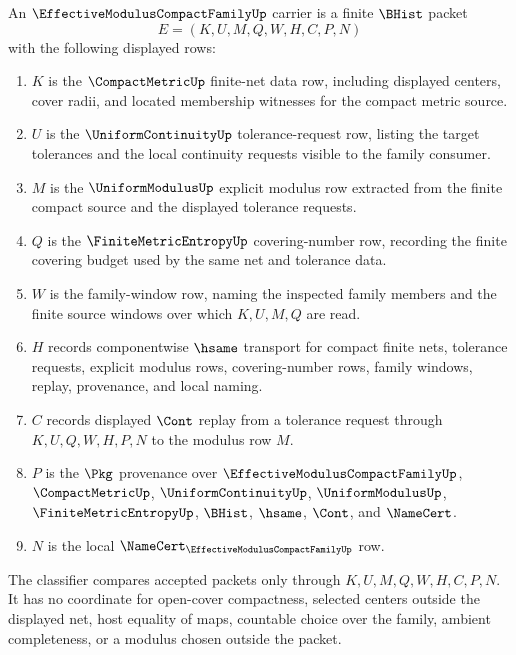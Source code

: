 \begin{definition}
\label{def:effective-modulus-compact-family-carrier}
An $\EffectiveModulusCompactFamilyUp$ carrier is a finite $\BHist$ packet
$$
E=(K,U,M,Q,W,H,C,P,N)
$$
with the following displayed rows:
\begin{enumerate}
\item $K$ is the $\CompactMetricUp$ finite-net data row, including displayed centers, cover radii, and located membership witnesses for the compact metric source.
\item $U$ is the $\UniformContinuityUp$ tolerance-request row, listing the target tolerances and the local continuity requests visible to the family consumer.
\item $M$ is the $\UniformModulusUp$ explicit modulus row extracted from the finite compact source and the displayed tolerance requests.
\item $Q$ is the $\FiniteMetricEntropyUp$ covering-number row, recording the finite covering budget used by the same net and tolerance data.
\item $W$ is the family-window row, naming the inspected family members and the finite source windows over which $K,U,M,Q$ are read.
\item $H$ records componentwise $\hsame$ transport for compact finite nets, tolerance requests, explicit modulus rows, covering-number rows, family windows, replay, provenance, and local naming.
\item $C$ records displayed $\Cont$ replay from a tolerance request through $K,U,Q,W,H,P,N$ to the modulus row $M$.
\item $P$ is the $\Pkg$ provenance over $\EffectiveModulusCompactFamilyUp$, $\CompactMetricUp$, $\UniformContinuityUp$, $\UniformModulusUp$, $\FiniteMetricEntropyUp$, $\BHist$, $\hsame$, $\Cont$, and $\NameCert$.
\item $N$ is the local $\NameCert_{\EffectiveModulusCompactFamilyUp}$ row.
\end{enumerate}
The classifier compares accepted packets only through $K,U,M,Q,W,H,C,P,N$. It has no coordinate for open-cover compactness, selected centers outside the displayed net, host equality of maps, countable choice over the family, ambient completeness, or a modulus chosen outside the packet.
\end{definition}

